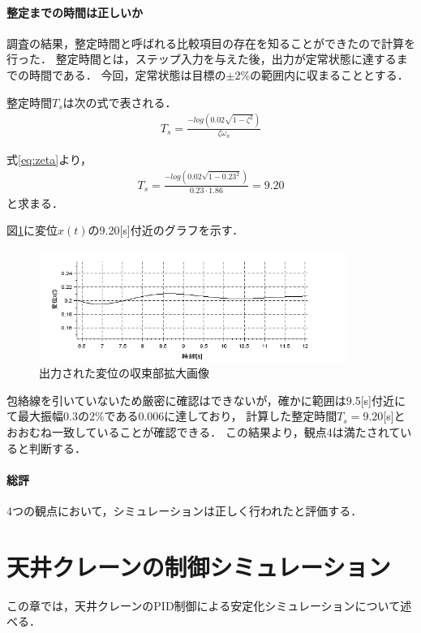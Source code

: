 \documentclass[dvipdfmx,titlepage,a4j]{jsarticle}  %
\begin{document}
\paragraph{整定までの時間は正しいか\\}
調査の結果，整定時間と呼ばれる比較項目の存在を知ることができたので計算を行った．
整定時間とは，ステップ入力を与えた後，出力が定常状態に達するまでの時間である．
今回，定常状態は目標の$\pm 2$\%の範囲内に収まることとする．

整定時間$T_s$は次の式で表される．
\begin{eqnarray}
  T_s = \frac{-log(0.02\sqrt{1 - \zeta^2})}{\zeta \omega_n} \nonumber
\end{eqnarray}

式\ref{eq:zeta}より，
\begin{eqnarray}
  T_s = \frac{-log(0.02\sqrt{1 - 0.23^2})}{0.23 \cdot 1.86} = 9.20\nonumber
\end{eqnarray}
と求まる．

図\ref{fig:bane-920.png}に変位$x(t)$の9.20[s]付近のグラフを示す．

\begin{figure}[H]
  \centering
  \includegraphics[width=10cm]{../graph/bane-920.png}
  \caption{出力された変位の収束部拡大画像}
  \label{fig:bane-920.png}
\end{figure}

包絡線を引いていないため厳密に確認はできないが，確かに範囲は9.5[s]付近にて最大振幅0.3の2\%である0.006に達しており，
計算した整定時間$T_s = 9.20$[s]とおおむね一致していることが確認できる．
この結果より，観点4は満たされていると判断する．

\paragraph{総評\\}
4つの観点において，シミュレーションは正しく行われたと評価する．

\section{天井クレーンの制御シミュレーション}
この章では，天井クレーンのPID制御による安定化シミュレーションについて述べる．
\end{document}
